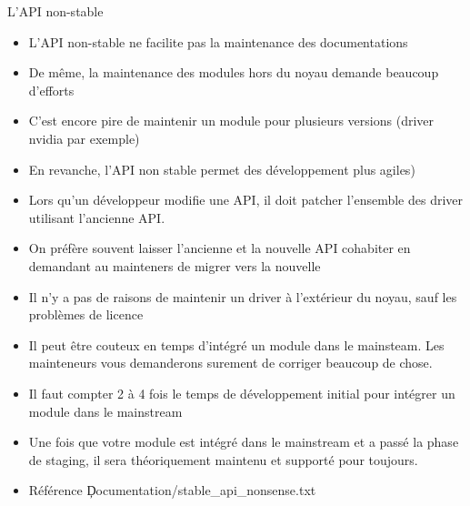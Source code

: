 \begin{frame}[fragile=singleslide]{L'API non-stable}
  \begin{itemize} 
  \item  L'API   non-stable  ne   facilite  pas  la   maintenance  des
    documentations
  \item  De même,  la maintenance  des modules  hors du  noyau demande
    beaucoup d'efforts
  \item  C'est  encore pire  de  maintenir  un  module pour  plusieurs
    versions (driver nvidia par exemple)
  \item En  revanche, l'API non  stable permet des  développement plus
    agiles)
  \item  Lors  qu'un développeur  modifie  une  API,  il doit  patcher
    l'ensemble des driver utilisant l'ancienne API.
  \item  On préfère  souvent  laisser l'ancienne  et  la nouvelle  API
    cohabiter en demandant au mainteners de migrer vers la nouvelle
  \item Il n'y  a pas de raisons de maintenir  un driver à l'extérieur
    du noyau, sauf les problèmes de licence
  \item  Il peut être  couteux en  temps d'intégré  un module  dans le
    mainsteam. Les  mainteneurs vous demanderons  surement de corriger
    beaucoup de chose.
  \item Il faut  compter 2 à 4 fois le  temps de développement initial
    pour intégrer un module dans le mainstream
  \item Une fois que votre module  est intégré dans le mainstream et a
    passé  la phase  de  staging, il  sera  théoriquement maintenu  et
    supporté pour toujours.
  \item Référence \c{Documentation/stable_api_nonsense.txt}
  \end{itemize} 
\end{frame} 

